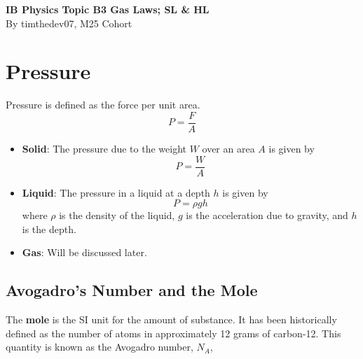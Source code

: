 \documentclass[a4paper,12pt]{article}
\let\oldsection\section
\renewcommand\section{\clearpage\oldsection}
\begin{document}
\pagestyle{fancy}


\begin{titlepage}
  \begin{center}

    \vspace*{8cm}
    \textbf{\Large {IB Physics Topic B3 Gas Laws; SL \& HL}} \\
    \vspace*{1cm}
    \large{By timthedev07, M25 Cohort}

  \end{center}
\end{titlepage}

\pagebreak
\tableofcontents
\pagebreak

\clearpage
\setcounter{page}{1}

\section{Pressure}

Pressure is defined as the force per unit area.
\begin{equation}\label{eq:pressure_def}
  P = \frac{F}{A}
\end{equation}
\begin{itemize}
  \item \textbf{Solid}: The pressure due to the weight $W$ over an area $A$ is given by
        \begin{equation}\label{eq:solid_pressure}
          P = \frac{W}{A}
        \end{equation}
  \item \textbf{Liquid}: The pressure in a liquid at a depth $h$ is given by
        \begin{equation}\label{eq:liquid_pressure}
          P = \rho gh
        \end{equation}
        where $\rho$ is the density of the liquid, $g$ is the acceleration due to gravity, and $h$ is the depth.
  \item \textbf{Gas}: Will be discussed later.
\end{itemize}

\subsection{Avogadro's Number and the Mole}

The \textbf{mole} is the SI unit for the amount of substance. It has been historically defined as the number of atoms in approximately 12 grams of carbon-12. This quantity is known as the Avogadro number, $N_A$,
\end{document}
